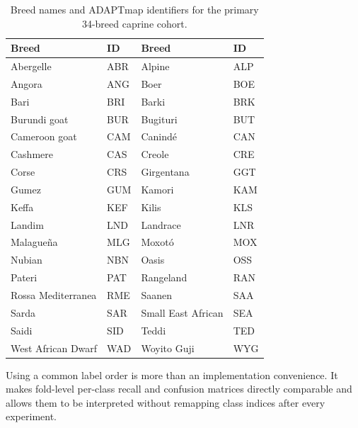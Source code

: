 \begin{table}[ht]
\centering
\caption{Breed names and ADAPTmap identifiers for the primary
34-breed caprine cohort.}
\label{tab:adaptmap_breed_mapping}
\begin{tabular}{ll@{\qquad}ll}
\hline
Breed & ID & Breed & ID \\
\hline
Abergelle & ABR &
Alpine & ALP \\

Angora & ANG &
Boer & BOE \\

Bari & BRI &
Barki & BRK \\

Burundi goat & BUR &
Bugituri & BUT \\

Cameroon goat & CAM &
Canindé & CAN \\

Cashmere & CAS &
Creole & CRE \\

Corse & CRS &
Girgentana & GGT \\

Gumez & GUM &
Kamori & KAM \\

Keffa & KEF &
Kilis & KLS \\

Landim & LND &
Landrace & LNR \\

Malagueña & MLG &
Moxotó & MOX \\

Nubian & NBN &
Oasis & OSS \\

Pateri & PAT &
Rangeland & RAN \\

Rossa Mediterranea & RME &
Saanen & SAA \\

Sarda & SAR &
Small East African & SEA \\

Saidi & SID &
Teddi & TED \\

West African Dwarf & WAD &
Woyito Guji & WYG \\
\hline
\end{tabular}
\end{table}

Using a common label order is more than an implementation convenience.
It makes fold-level per-class recall and confusion matrices directly
comparable and allows them to be interpreted without remapping class
indices after every experiment.

